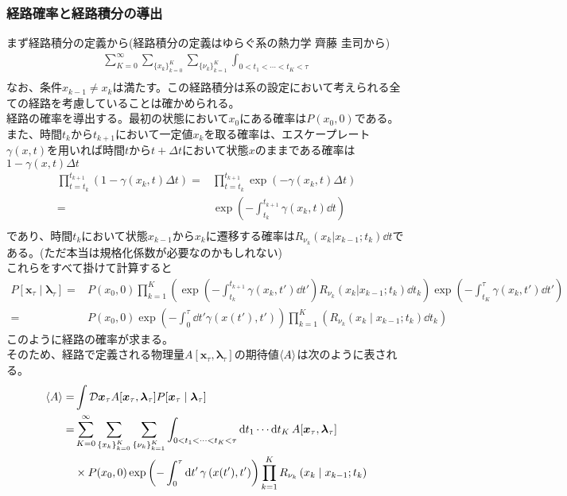 \documentclass{ltjsarticle}
\begin{document}
\subsubsection{経路確率と経路積分の導出}
まず経路積分の定義から(経路積分の定義はゆらぐ系の熱力学 齊藤 圭司から)\\
\begin{align}
  \sum_{K=0}^{\infty}\sum_{\lbrace x_k\rbrace_{k=0}^K}\sum_{\lbrace\nu_k\rbrace_{k=1}^K}\int_{0<t_1<\cdots<t_K<\tau}\\
\end{align}
なお、条件$x_{k-1}\neq x_k$は満たす。この経路積分は系の設定において考えられる全ての経路を考慮していることは確かめられる。\\
経路の確率を導出する。最初の状態において$x_0$にある確率は$P(x_0,0)$である。また、時間$t_{k}$から$t_{k+1}$において一定値$x_k$を取る確率は、エスケープレート$\gamma(x,t)$を用いれば時間$t$から$t+\Delta{t}$において状態$x$のままである確率は$1-\gamma(x,t)\Delta{t}$
\begin{align}
  \prod_{t=t_k}^{t_{k+1}}(1-\gamma(x_k,t)\Delta{t})=&\prod_{t=t_k}^{t_{k+1}}\exp\left(-\gamma(x_k,t)\Delta{t}\right)\\
  =&\exp\left(-\int_{t_k}^{t_{k+1}}\gamma(x_k,t)\dd{t}\right)\\
\end{align}
であり、時間$t_k$において状態$x_{k-1}$から$x_k$に遷移する確率は$R_{\nu_k}(x_k|x_{k-1};t_k)\dd{t}$である。(ただ本当は規格化係数が必要なのかもしれない)\\
これらをすべて掛けて計算すると
\begin{align}
  P[\bm{x}_\tau\mid\bm{\lambda}_\tau]
  =&P(x_0,0)\prod_{k=1}^K \left( \exp\left(-\int_{t_k}^{t_{k+1}}\gamma(x_k,t')\dd{t'}\right)R_{\nu_k}(x_k|x_{k-1};t_k) \dd{t_k}\right)\exp\left(-\int_{t_K}^{\tau}\gamma(x_k,t')\dd{t'}\right) \\
  =&P(x_0,0)\exp\left(-\int_0^\tau \dd{t'}\gamma\left(x(t'),t'\right)\right)\prod_{k=1}^K \left(R_{\nu_k}\left(x_k\mid x_{k-1};t_k\right)\dd{t_k}\right)
\end{align}
このように経路の確率が求まる。\\
そのため、経路で定義される物理量$A[\bm{x}_\tau,\bm{\lambda}_\tau]$の期待値$\ev{A}$は次のように表される。
\begin{align}
  \ev{A}=&\int \mathcal{D}\bm{x}_\tau A[\bm{x}_\tau,\bm{\lambda}_\tau]P[\bm{x}_\tau\mid\bm{\lambda}_\tau]\\
  =&\sum_{K=0}^{\infty}\sum_{\lbrace x_k\rbrace_{k=0}^K}\sum_{\lbrace\nu_k\rbrace_{k=1}^K}\int_{0<t_1<\cdots<t_K<\tau}\dd{t_1}\cdots \dd{t_K}A[\bm{x}_\tau,\bm{\lambda}_\tau]\\
  &\times P(x_0,0)\exp\left(-\int_0^\tau \dd{t'}\gamma\left(x(t'),t'\right)\right)\prod_{k=1}^K R_{\nu_k}\left(x_k\mid x_{k-1};t_k\right)\\
\end{align}
\end{document}
